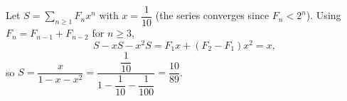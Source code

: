 Let $S=\sum_{n\ge1}F_nx^n$ with $x=\dfrac1{10}$ (the series converges since $F_n<2^n$). Using $F_{n}=F_{n-1}+F_{n-2}$ for $n\ge3$,
\[S-xS-x^2S=F_1x+(F_2-F_1)x^2=x,\]
so $S=\dfrac{x}{1-x-x^2}=\dfrac{\dfrac1{10}}{1-\dfrac1{10}-\dfrac1{100}}=\boxed{\dfrac{10}{89}}$.
